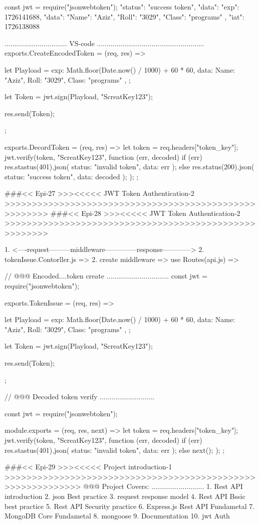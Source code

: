 const jwt = require("jsonwebtoken");
"status": "success token",
    "data": {
        "exp": 1726141688,
        "data": {
            "Name": "Aziz",
            "Roll": "3029",
            "Class": "programs"
        },
        "iat": 1726138088
    }

................................ VS-code .......................................................
exports.CreateEncodedToken = (req, res) => {
  let Playload = {
    exp: Math.floor(Date.now() / 1000) + 60 * 60,
    data: { Name: "Aziz", Roll: "3029", Class: "programs" },
  };

  let Token = jwt.sign(Playload, "ScreatKey123");

  res.send(Token);
};

exports.DecordToken = (req, res) => {
  let token = req.headers["token_key"];
  jwt.verify(token, "ScreatKey123", function (err, decoded) {
    if (err) {
      res.stastus(401).json({ status: "invalid token", data: err });
    } else {
      res.status(200).json({ status: "success token", data: decoded });
    }
  });
};

###<< Epi-27 >>><<<<< JWT Token Authentication-2 >>>>>>>>>>>>>>>>>>>>>>>>>>>>>>>>>>>>>>>>>>>>>>>>>>>>>>
###<< Epi-28 >>><<<<< JWT Token Authentication-2 >>>>>>>>>>>>>>>>>>>>>>>>>>>>>>>>>>>>>>>>>>>>>>>>>>>>>>

1. <----request---------middleware--------------response------------>
2. tokenIssue.Contorller.js => 
2. create  middleware => use Routes(api.js) => 

// @@@ Encoded....token create ................................
const jwt = require("jsonwebtoken");

exports.TokenIssue = (req, res) => {
  let Playload = {
    exp: Math.floor(Date.now() / 1000) + 60 * 60,
    data: { Name: "Aziz", Roll: "3029", Class: "programs" },
  };

  let Token = jwt.sign(Playload, "ScreatKey123");

  res.send(Token);
};

// @@@ Decoded token verify ............................

const jwt = require("jsonwebtoken");

module.exports = (req, res, next) => {
  let token = req.headers["token_key"];
  jwt.verify(token, "ScreatKey123", function (err, decoded) {
    if (err) {
      res.stastus(401).json({ status: "invalid token", data: err });
    } else {
      next();
    }
  });
};

###<< Epi-29 >>><<<<< Project introduction-1 >>>>>>>>>>>>>>>>>>>>>>>>>>>>>>>>>>>>>>>>>>>>>>>>>>>>>>>>>>>>
@@@ Project Covers: ...........................
1. Rest API introduction
2. json Best practice
3. request response model
4. Rest API Bssic best practice
5. Rest API Security practice
6. Express.js Rest API Fundametal
7. MongoDB Core Fundametal 
8. mongoose
9. Documentation
10. jwt Auth 

